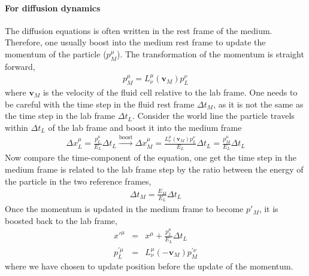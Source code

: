 \paragraph{For diffusion dynamics} The diffusion equations is often written in the rest frame of the medium.
Therefore, one usually boost into the medium rest frame to update the momentum of the particle ($p_{M}^\mu$).
The transformation of the momentum is straight forward,
\begin{eqnarray}
p_{M}^\mu = L^\mu_\nu(\mathbf{v}_{M}) p_{L}^\nu
\end{eqnarray}
where $\mathbf{v}_{M}$ is the velocity of the fluid cell relative to the lab frame.
One needs to be careful with the time step in the fluid rest frame $\Delta t_{M}$, as it is not the same as the time step in the lab frame $\Delta t_{L}$.
Consider the world line the particle travels within $\Delta t_{L}$ of the lab frame and boost it into the medium frame
\begin{eqnarray}
\Delta x_{L}^\mu = \frac{p_{L}^\mu}{E_L} \Delta t_{L} \xrightarrow{\textrm{boost}} \Delta x_{M}^\mu = \frac{L^\mu_\nu(\mathbf{v}_{M}) p_{L}^\nu}{E_L} \Delta t_L = \frac{p_{M}^\mu}{E_L} \Delta t_L
\end{eqnarray}
Now compare the time-component of the equation, one get the time step in the medium frame is related to the lab frame step by the ratio between the energy of the particle in the two reference frames,
\begin{eqnarray}
\Delta t_M = \frac{E_M}{E_L} \Delta t_L
\end{eqnarray}
Once the momentum is updated in the medium frame to become $p'_M$, it is boosted back to the lab frame,
\begin{eqnarray}
x'^{\mu} &=& x^{\mu} + \frac{p_{L}^\mu}{E_L} \Delta t_{L} \\
p_{L}^{'\mu} &=& L^\mu_\nu(-\mathbf{v}_{M}) p_{M}^{'\nu}
\end{eqnarray}
where we have chosen to update position before the update of the momentum.

